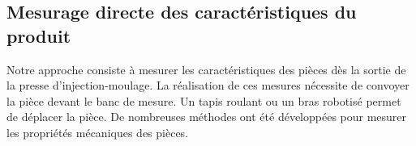 \subsection{Mesurage directe des caractéristiques du produit}
%
%
%
%
%
%
%
Notre approche consiste à mesurer les caractéristiques des pièces dès la sortie de la presse d'injection-moulage.
La réalisation de ces mesures nécessite de convoyer la pièce devant le banc de mesure.
Un tapis roulant ou un bras robotisé permet de déplacer la pièce.
De nombreuses méthodes ont été développées pour mesurer les propriétés mécaniques des pièces.

